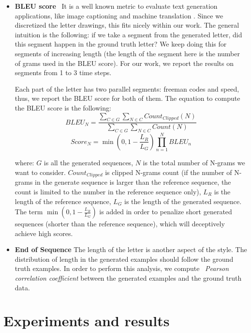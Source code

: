 \documentclass[conference]{IEEEtran}
\begin{document}
\begin{itemize}
    \item \textbf{BLEU score}~\cite{papineni2002bleu} It is a well known metric to evaluate text generation applications, like image captioning \cite{karpathy2015deep,vinyals2015show} and machine translation \cite{Sutskever:2014:SSL:2969033.2969173}. Since we discretized the letter drawings, this fits nicely within our work. The general intuition is the following: if we take a segment from the generated letter, did this segment happen in the ground truth letter? We keep doing this for segments of increasing length (the length of the segment here is the number of grams used in the BLEU score). For our work, we report the results on segments from 1 to 3 time steps.
    
    Each part of the letter has two parallel segments: freeman codes and speed, thus, we report the BLEU score for both of them. 
    The equation to compute the BLEU score is the following:
    \begin{equation}
    BLEU_{N} = \frac{\sum_{C\in G}\sum_{N\in C}Count_{Clipped}(N)}{\sum_{C\in G}\sum_{N\in C}Count(N)}
    \end{equation}
    \begin{equation}
    Score_{N} = \min{(0, 1 - \frac{L_{R}}{L_{G}})} \prod^{N}_{n=1}BLEU_{n}
    \end{equation}
    
    where: $G$ is all the generated sequences, $N$ is the total number of N-grams we want to consider. $Count_{Clipped}$ is clipped N-grams count (if the number of N-grams in the generate sequence is larger than the reference sequence, the count is limited to the number in the reference sequence only), $L_R$ is the length of the reference sequence, $L_G$ is the length of the generated sequence. 
    The term $\min(0, 1 - \frac{L_{R}}{L_{G}})$ is added in order to penalize short generated sequences (shorter than the reference sequence), which will deceptively achieve high scores.
    
    \item \textbf{End of Sequence} The length of the letter is another aspect of the style. The distribution of length in the generated examples should follow the ground truth examples. In order to perform this analysis, we compute ~\textit{Pearson correlation coefficient} between the generated examples and the ground truth data.
\end{itemize}

\section{Experiments and results}
\end{document}
